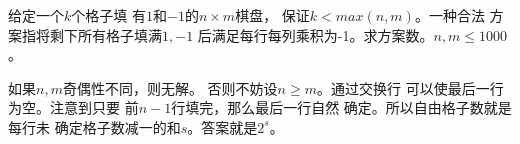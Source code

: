 \begin{prob}
	给定一个$k$个格子填
	有$1$和$-1$的$n \times m$棋盘，
	保证$k<max(n,m)$。一种合法
	方案指将剩下所有格子填满$1,-1$
	后满足每行每列乘积为-1。求方案数。$n,m \le 1000$。
\end{prob}

\begin{sol}
	如果$n,m$奇偶性不同，则无解。
	否则不妨设$n \ge m$。通过交换行
	可以使最后一行为空。注意到只要
	前$n-1$行填完，那么最后一行自然
	确定。所以自由格子数就是每行未
	确定格子数减一的和$s$。答案就是$2^s$。
\end{sol}
